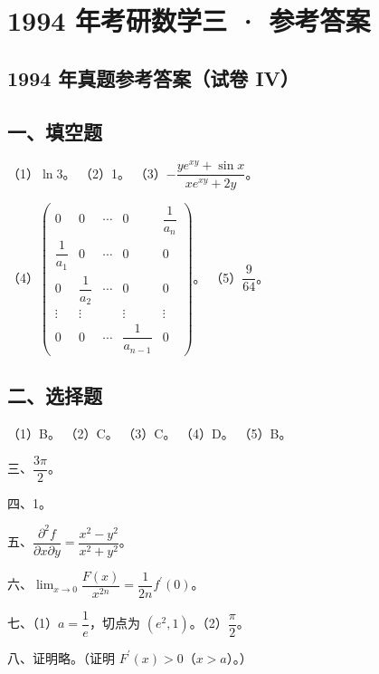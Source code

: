 \documentclass[UTF8,12pt]{ctexart}
\begin{document}
\section*{1994 年考研数学三 · 参考答案}
\subsection*{1994 年真题参考答案（试卷 IV）}

\subsection*{一、填空题}

（1）\(\displaystyle \ln3\)。 （2）1。 （3）\(\displaystyle -\dfrac{\displaystyle ye^{xy}+\sin x}{\displaystyle xe^{xy}+2y}\)。


（4）\(\displaystyle \begin{pmatrix}0&0&\cdots&0&\dfrac{\displaystyle 1}{\displaystyle a_n}\\\dfrac{\displaystyle 1}{\displaystyle a_1}&0&\cdots&0&0\\0&\dfrac{\displaystyle 1}{\displaystyle a_2}&\cdots&0&0\\\vdots&\vdots&&\vdots&\vdots\\0&0&\cdots&\dfrac{\displaystyle 1}{\displaystyle a_{n-1}}&0\end{pmatrix}\)。 （5）\(\displaystyle \dfrac{\displaystyle 9}{\displaystyle 64}\)。


\subsection*{二、选择题}

（1）B。 （2）C。 （3）C。 （4）D。 （5）B。


三、\(\displaystyle \dfrac{\displaystyle 3\pi}{\displaystyle 2}\)。


四、1。


五、\(\displaystyle \dfrac{\displaystyle \partial^2f}{\displaystyle \partial x\partial y}=\dfrac{\displaystyle x^2-y^2}{\displaystyle x^2+y^2}\)。


六、\(\displaystyle \lim_{x\to0}\dfrac{\displaystyle F(x)}{\displaystyle x^{2n}}=\dfrac{\displaystyle 1}{\displaystyle 2n}f^{\prime}(0)\)。


七、（1）\(\displaystyle a=\dfrac{\displaystyle 1}{\displaystyle e}\)，切点为 \(\displaystyle (e^2,\allowbreak 1)\)。（2）\(\displaystyle \dfrac{\displaystyle \pi}{\displaystyle 2}\)。


八、证明略。（证明 \(\displaystyle F^{\prime}(x)>0\)（\(\displaystyle x>a\)）。）
\end{document}
